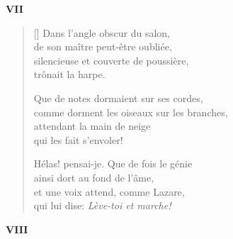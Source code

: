 \documentclass[a4paper,12pt]{book}
\begin{document}
\bigskip

\begin{center}
  \textbf{VII}
\end{center}

\settowidth{\versewidth}{comme dorment les oiseaux sur les branches,}

\begin{verse}[\versewidth]
  Dans l'angle obscur du salon, \\
  de son maître peut-être oubliée, \\
  silencieuse et couverte de poussière, \\
  trônait la harpe.

  Que de notes dormaient sur ses cordes, \\
  comme dorment les oiseaux sur les branches, \\
  attendant la main de neige \\
  qui les fait s'envoler!

  Hélas! pensai-je. Que de fois le génie \\
  ainsi dort au fond de l'âme, \\
  et une voix attend, comme Lazare, \\
  qui lui dise: \emph{Lève-toi et marche!}
\end{verse}

\bigskip

\begin{center}
  \textbf{VIII}
\end{center}

\settowidth{\versewidth}{et m'inonder de leur lumière, et avec elles}
\end{document}
